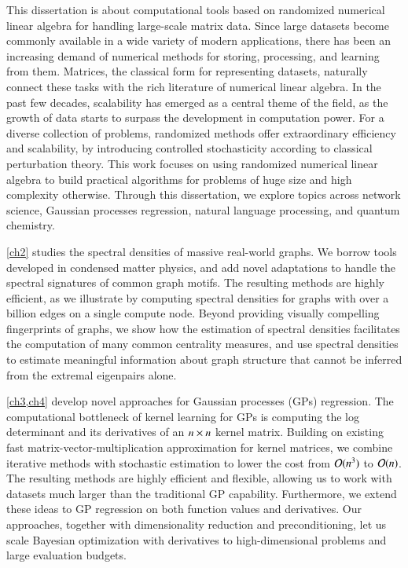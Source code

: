 This dissertation is about computational tools based on randomized numerical
linear algebra for handling large-scale matrix data. Since large datasets become
commonly available in a wide variety of modern applications, there has been an
increasing demand of numerical methods for storing, processing, and learning
from them. Matrices, the classical form for representing datasets, naturally
connect these tasks with the rich literature of numerical linear algebra. In the
past few decades, scalability has emerged as a central theme of the field, as
the growth of data starts to surpass the development in computation power. For a
diverse collection of problems, randomized methods offer extraordinary
efficiency and scalability, by introducing controlled stochasticity according to
classical perturbation theory. This work focuses on using randomized
numerical linear algebra to build practical algorithms for problems of huge size
and high complexity otherwise. Through this dissertation, we explore topics
across network science, Gaussian processes regression, natural language
processing, and quantum chemistry.

\cref{ch2} studies the spectral densities of massive real-world graphs. We
borrow tools developed in condensed matter physics, and add novel adaptations to
handle the spectral signatures of common graph motifs.  The resulting methods
are highly efficient, as we illustrate by computing spectral densities for
graphs with over a billion edges on a single compute node. Beyond providing
visually compelling fingerprints of graphs, we show how the  estimation of
spectral densities facilitates the computation of many common centrality
measures, and use spectral densities to estimate meaningful information about
graph structure that cannot be inferred from the extremal eigenpairs alone.

\cref{ch3,ch4} develop novel approaches for Gaussian processes (GPs) regression.
The computational bottleneck of kernel learning for GPs is computing the log
determinant and its derivatives of an $n\mathbin{\times} n$ kernel matrix. Building on
existing fast matrix-vector-multiplication approximation for kernel
matrices, we combine iterative methods with stochastic estimation to
lower the cost from $\mathcal{O}(n^3)$ to $\mathcal{O}(n)$. The resulting methods are highly
efficient and flexible, allowing us to work with datasets much larger than
the traditional GP capability. Furthermore, we extend these ideas to GP
regression on both function values and derivatives. Our approaches, together
with dimensionality reduction and preconditioning, let us scale Bayesian
optimization with derivatives to high-dimensional problems and large evaluation
budgets.

